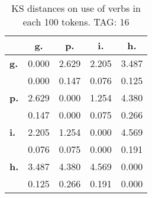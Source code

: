 \begin{table}[h!]
\begin{center}
\begin{tabular}{| l || c | c | c | c |}\hline
 & {\bf g.} & {\bf p.} & {\bf i.} & {\bf h.} \\\hline\hline
{\bf g.} & 0.000 & 2.629 & 2.205 & 3.487 \\
{\bf } & 0.000 & 0.147 & 0.076 & 0.125 \\\hline
{\bf p.} & 2.629 & 0.000 & 1.254 & 4.380 \\
{\bf } & 0.147 & 0.000 & 0.075 & 0.266 \\\hline
{\bf i.} & 2.205 & 1.254 & 0.000 & 4.569 \\
{\bf } & 0.076 & 0.075 & 0.000 & 0.191 \\\hline
{\bf h.} & 3.487 & 4.380 & 4.569 & 0.000 \\
{\bf } & 0.125 & 0.266 & 0.191 & 0.000 \\\hline
\end{tabular}
\caption{KS distances on use of verbs in each 100 tokens. TAG: 16}
\end{center}
\end{table}